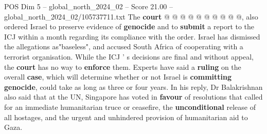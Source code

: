 \begin{textsample}{POS Dim 5 – global\_north\_2024\_02 – Score 21.00 – global\_north\_2024\_02/105737711.txt}
The \textbf{court} @ @ @ @ @ @ @ @ @ @, also ordered Israel to preserve evidence of \textbf{genocide} and to \textbf{submit} a report to the ICJ within a month regarding its compliance with the order.
Israel has dismissed the allegations as"baseless", and accused South Africa of cooperating with a terrorist organisation.
While the ICJ ' s decisions are final and without appeal, the \textbf{court} has no way to \textbf{enforce} them.
Experts have said a \textbf{ruling} on the overall \textbf{case}, which will determine whether or not Israel is \textbf{committing} \textbf{genocide}, could take as long as three or four years.
In his reply, Dr Balakrishnan also said that at the UN, Singapore has voted in \textbf{favour} of resolutions that called for an immediate humanitarian truce or ceasefire, the \textbf{unconditional} release of all hostages, and the urgent and unhindered provision of humanitarian aid to Gaza.

\end{textsample}
